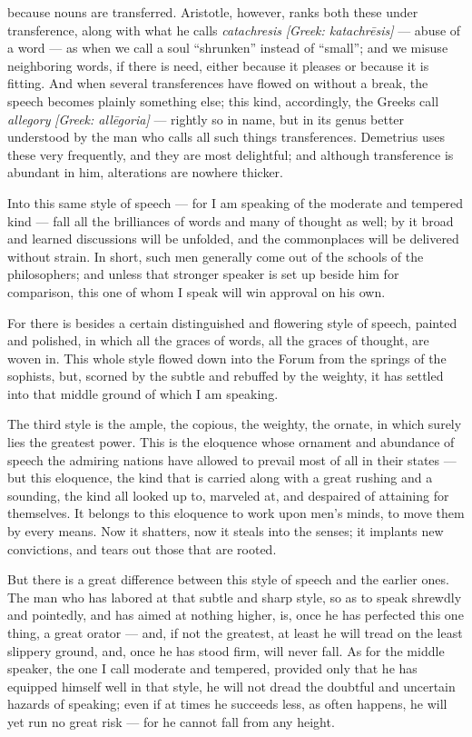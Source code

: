  because nouns are transferred. Aristotle, however, ranks both these under transference, along with what he calls \textit{catachresis} \textit{[Greek: katachrēsis]} — abuse of a word — as when we call a soul ``shrunken'' instead of ``small''; and we misuse neighboring words, if there is need, either because it pleases or because it is fitting. And when several transferences have flowed on without a break, the speech becomes plainly something else; this kind, accordingly, the Greeks call \textit{allegory} \textit{[Greek: allēgoria]} — rightly so in name, but in its genus better understood by the man who calls all such things transferences. Demetrius uses these very frequently, and they are most delightful; and although transference is abundant in him, alterations are nowhere thicker.

 Into this same style of speech — for I am speaking of the moderate and tempered kind — fall all the brilliances of words and many of thought as well; by it broad and learned discussions will be unfolded, and the commonplaces will be delivered without strain. In short, such men generally come out of the schools of the philosophers; and unless that stronger speaker is set up beside him for comparison, this one of whom I speak will win approval on his own.

 For there is besides a certain distinguished and flowering style of speech, painted and polished, in which all the graces of words, all the graces of thought, are woven in. This whole style flowed down into the Forum from the springs of the sophists, but, scorned by the subtle and rebuffed by the weighty, it has settled into that middle ground of which I am speaking.

 The third style is the ample, the copious, the weighty, the ornate, in which surely lies the greatest power. This is the eloquence whose ornament and abundance of speech the admiring nations have allowed to prevail most of all in their states — but this eloquence, the kind that is carried along with a great rushing and a sounding, the kind all looked up to, marveled at, and despaired of attaining for themselves. It belongs to this eloquence to work upon men's minds, to move them by every means. Now it shatters, now it steals into the senses; it implants new convictions, and tears out those that are rooted.

 But there is a great difference between this style of speech and the earlier ones. The man who has labored at that subtle and sharp style, so as to speak shrewdly and pointedly, and has aimed at nothing higher, is, once he has perfected this one thing, a great orator — and, if not the greatest, at least he will tread on the least slippery ground, and, once he has stood firm, will never fall. As for the middle speaker, the one I call moderate and tempered, provided only that he has equipped himself well in that style, he will not dread the doubtful and uncertain hazards of speaking; even if at times he succeeds less, as often happens, he will yet run no great risk — for he cannot fall from any height.

